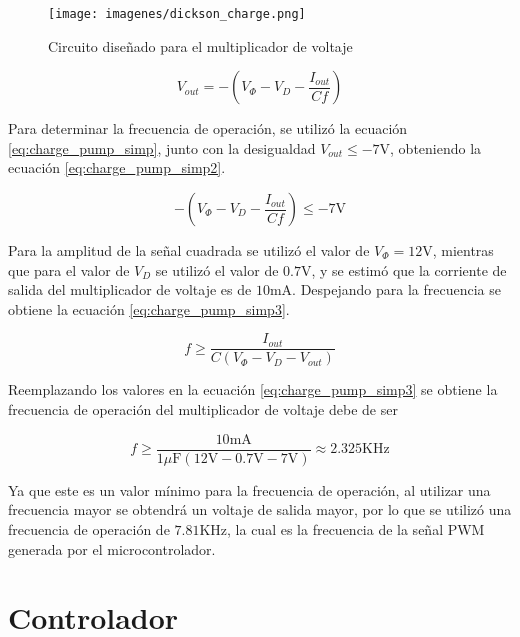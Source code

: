     \begin{figure}[H]
        \centering
        \texttt{[image: imagenes/dickson\_charge.png]}
        \caption{Circuito diseñado para el multiplicador de voltaje}
        \label{fig:charge_pump_dis}
    \end{figure}

    \begin{equation}
        V_{out} = -\left(V_\Phi - V_D - \frac{I_{out}}{Cf}  \right)
        \label{eq:charge_pump_simp}
    \end{equation}

    Para determinar la frecuencia de operación, se utilizó la ecuación 
    \ref{eq:charge_pump_simp}, junto con la desigualdad 
    $V_{out} \leq -7\text{V}$, obteniendo la ecuación 
    \ref{eq:charge_pump_simp2}.

    \begin{equation}
        -\left(V_\Phi - V_D - \frac{I_{out}}{Cf}\right) \leq -7\text{V}
        \label{eq:charge_pump_simp2}    
    \end{equation}

    Para la amplitud de la señal cuadrada se utilizó el valor de 
    $V_\Phi = 12 \text{V}$, mientras que para 
    el valor de $V_D$ se utilizó el valor de $0.7\text{V}$, y se estimó que
    la corriente de salida del multiplicador de voltaje es de $10\text{mA}$.
    Despejando para la frecuencia se obtiene la ecuación \ref{eq:charge_pump_simp3}.

    \begin{equation}
        f \geq \frac{I_{out}}{C(V_\Phi - V_D - V_{out})}
        \label{eq:charge_pump_simp3}
    \end{equation}

    Reemplazando los valores en la ecuación \ref{eq:charge_pump_simp3} se obtiene
    la frecuencia de operación del multiplicador de voltaje debe de ser 

        $$
            f \geq \frac{10\text{mA}}{1\mu\text{F}(12\text{V} - 0.7\text{V}
             - 7\text{V})} \approx 2.325\text{KHz}
        $$

    Ya que este es un valor mínimo para la frecuencia de operación, al utilizar
    una frecuencia mayor se obtendrá un voltaje de salida mayor, por lo que se
    utilizó una frecuencia de operación de $7.81\text{KHz}$, la cual es la
    frecuencia de la señal PWM generada por el microcontrolador. 

    

    \section{Controlador}

